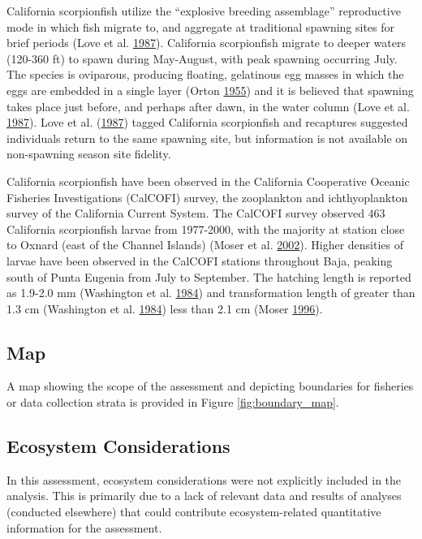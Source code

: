 \documentclass[12pt,]{article}
\begin{document}
California scorpionfish utilize the ``explosive breeding assemblage''
reproductive mode in which fish migrate to, and aggregate at traditional
spawning sites for brief periods (Love et al.
\protect\hyperlink{ref-Love1987}{1987}). California scorpionfish migrate
to deeper waters (120-360 ft) to spawn during May-August, with peak
spawning occurring July. The species is oviparous, producing floating,
gelatinous egg masses in which the eggs are embedded in a single layer
(Orton \protect\hyperlink{ref-Orton1955}{1955}) and it is believed that
spawning takes place just before, and perhaps after dawn, in the water
column (Love et al. \protect\hyperlink{ref-Love1987}{1987}). Love et al.
(\protect\hyperlink{ref-Love1987}{1987}) tagged California scorpionfish
and recaptures suggested individuals return to the same spawning site,
but information is not available on non-spawning season site fidelity.

California scorpionfish have been observed in the California Cooperative
Oceanic Fisheries Investigations (CalCOFI) survey, the zooplankton and
ichthyoplankton survey of the California Current System. The CalCOFI
survey observed 463 California scorpionfish larvae from 1977-2000, with
the majority at station close to Oxnard (east of the Channel Islands)
(Moser et al. \protect\hyperlink{ref-Moser2002}{2002}). Higher densities
of larvae have been observed in the CalCOFI stations throughout Baja,
peaking south of Punta Eugenia from July to September. The hatching
length is reported as 1.9-2.0 mm (Washington et al.
\protect\hyperlink{ref-Washington1984}{1984}) and transformation length
of greater than 1.3 cm (Washington et al.
\protect\hyperlink{ref-Washington1984}{1984}) less than 2.1 cm (Moser
\protect\hyperlink{ref-Moser1996}{1996}).

\subsection{Map}\label{map}

A map showing the scope of the assessment and depicting boundaries for
fisheries or data collection strata is provided in Figure
\ref{fig:boundary_map}.

\subsection{Ecosystem Considerations}\label{ecosystem-considerations-1}

In this assessment, ecosystem considerations were not explicitly
included in the analysis. This is primarily due to a lack of relevant
data and results of analyses (conducted elsewhere) that could contribute
ecosystem-related quantitative information for the assessment.
\end{document}
